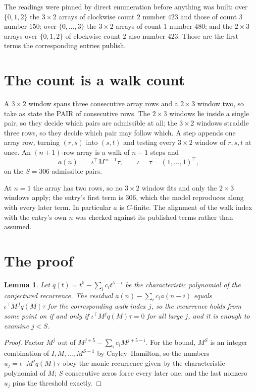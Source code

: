 \documentclass[11pt,a4paper]{article}
\theoremstyle{plain}
\newtheorem{lemma}[theorem]{Lemma}
\theoremstyle{definition}
\begin{document}
The readings were pinned by direct enumeration before anything was built: over
$\{0,1,2\}$ the $3\times2$ arrays of clockwise count $2$ number $423$ and those of count
$3$ number $150$; over $\{0,\dots,3\}$ the $3\times2$ arrays of count $1$ number $480$;
and the $2\times3$ arrays over $\{0,1,2\}$ of clockwise count $2$ also number $423$. Those
are the first terms the corresponding entries publish.

\section{The count is a walk count}

A $3\times2$ window spans three consecutive array rows and a $2\times3$
window two, so take as state the PAIR of consecutive rows. The $2\times3$ windows lie inside a
single pair, so they decide which pairs are admissible at all; the $3\times2$ windows straddle
three rows, so they decide which pair may follow which. A step appends one array row, turning
$(r,s)$ into $(s,t)$ and testing every $3\times2$ window of $r,s,t$ at once. An $(n+1)$-row
array is a walk of $n-1$ steps and
\[
a(n)\;=\;\iota^{\!\top}M^{\,n-1}\tau,\qquad\iota=\tau=(1,\dots,1)^{\!\top},
\]
on the $S=306$ admissible pairs.

At $n=1$ the array has two rows, so no $3\times2$ window fits and only the
$2\times3$ windows apply; the entry's first term is
$306$, which the model reproduces along with every later term.
In particular $a$ is $C$-finite. The alignment of the walk index with the entry's own $n$ was
checked against its published terms rather than assumed.

\section{The proof}

\begin{lemma}\label{lem:crit}
Let $q(t)=t^{5}-\sum_i c_it^{5-i}$ be the characteristic polynomial of the
conjectured recurrence. The residual $a(n)-\sum_ic_ia(n-i)$ equals
$\iota^{\!\top}M^{\,j}q(M)\tau$ for the corresponding walk index $j$, so the recurrence
holds from some point on if and only if $\iota^{\!\top}M^{j}q(M)\tau=0$ for all large $j$,
and it is enough to examine $j<S$.
\end{lemma}

\begin{proof}
Factor $M^{j}$ out of $M^{j+5}-\sum_ic_iM^{j+5-i}$. For the bound, $M^{S}$
is an integer combination of $I,M,\dots,M^{S-1}$ by Cayley--Hamilton, so the numbers
$u_j=\iota^{\!\top}M^{j}q(M)\tau$ obey the monic recurrence given by the characteristic
polynomial of $M$; $S$ consecutive zeros force every later one, and the last nonzero $u_j$
pins the threshold exactly.
\end{proof}
\end{document}
